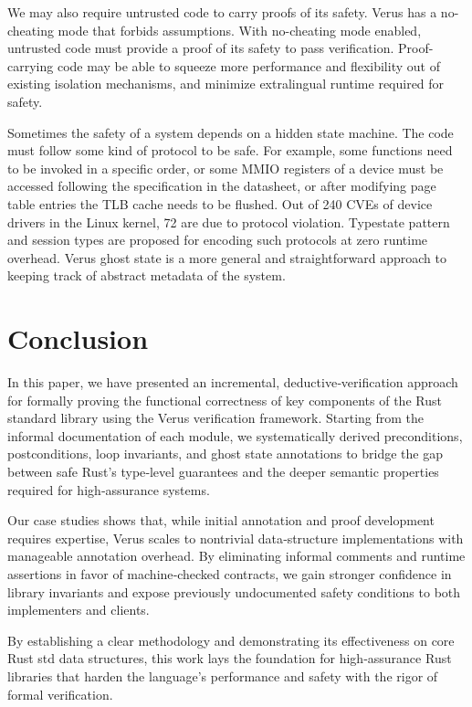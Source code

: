 \documentclass[conference]{IEEEtran}
\begin{document}
We may also require untrusted code to carry proofs of its safety. Verus has a no-cheating mode that forbids assumptions. With no-cheating mode enabled, untrusted code must provide a proof of its safety to pass verification. Proof-carrying code may be able to squeeze more performance and flexibility out of existing isolation mechanisms, and minimize extralingual runtime required for safety. 

Sometimes the safety of a system depends on a hidden state machine. The code must follow some kind of protocol to be safe. For example, some functions need to be invoked in a specific order, or some MMIO registers of a device must be accessed following the specification in the datasheet, or after modifying page table entries the TLB cache needs to be flushed. Out of 240 CVEs of device drivers in the Linux kernel, 72 are due to protocol violation\cite{RFL_security}. Typestate pattern and session types\cite{sessiontype} are proposed for encoding such protocols at zero runtime overhead. Verus ghost state is a more general and straightforward approach to keeping track of abstract metadata of the system.       

\section{Conclusion}
In this paper, we have presented an incremental, deductive‐verification approach for formally proving the functional correctness of key components of the Rust standard library using the Verus verification framework. Starting from the informal documentation of each module, we systematically derived preconditions, postconditions, loop invariants, and ghost state annotations to bridge the gap between safe Rust’s type‐level guarantees and the deeper semantic properties required for high‐assurance systems.

Our case studies shows that, while initial annotation and proof development requires expertise, Verus scales to nontrivial data‐structure implementations with manageable annotation overhead. By eliminating informal comments and runtime assertions in favor of machine‐checked contracts, we gain stronger confidence in library invariants and expose previously undocumented safety conditions to both implementers and clients.


By establishing a clear methodology and demonstrating its effectiveness on core Rust std data structures, this work lays the foundation for high‐assurance Rust libraries that harden the language’s performance and safety with the rigor of formal verification.
\end{document}
